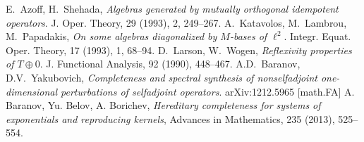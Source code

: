 \documentclass[a4paper,12pt]{article}
\numberwithin{prop_under_lemma}{lemma}
\begin{document}
\small
{}
\begin{thebibliography}{9}
    E.~\!Azoff, H.~\!Shehada,
    \emph{Algebras generated by mutually orthogonal idempotent operators}.
    J. Oper. Theory, 29 (1993), 2, 249--267.
    A.~\!Katavolos, M.~\!Lambrou, M.~\!Papadakis,
    \emph{On some algebras diagonalized by $M$-bases of $\ell^2$}.
    Integr. Equat. Oper. Theory, 17 (1993), 1, 68--94.
    D.~\!Larson, W.~\!Wogen,
    \emph{Reflexivity properties of $T \oplus 0$}.
    J. Functional Analysis, 92 (1990), 448--467.
    A.D.~\!Baranov, D.V.~\!Yakubovich,
    \emph{Completeness and spectral synthesis of nonselfadjoint one-dimensional
    perturbations of selfadjoint operators}.
    arXiv:1212.5965 [math.FA]
     A. Baranov, Yu. Belov, A. Borichev, \emph{Hereditary completeness for systems of exponentials and reproducing kernels}, Advances in Mathematics, 235 (2013), 525--554.

\end{thebibliography}
\end{document}
